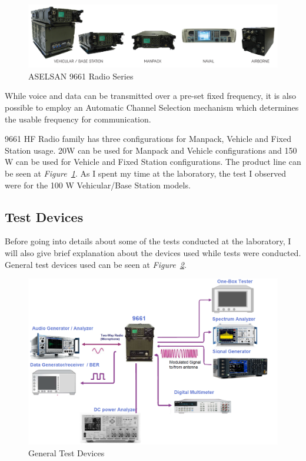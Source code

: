 \begin{figure}[H]
	\center
	\setlength{\unitlength}{\textwidth} 
	\includegraphics[width=0.95\unitlength]{radio_type}
	\caption{\label{fig:radtyp}ASELSAN 9661 Radio Series\cite{9661} }
\end{figure}

	 While voice and data can be transmitted over a pre-set fixed frequency, it is also possible to employ an Automatic Channel Selection mechanism which determines the usable frequency for communication.

	


	
	9661 HF Radio family has three configurations for Manpack, Vehicle and Fixed Station usage. 20W can be used for Manpack and Vehicle configurations and 150 W can be used for Vehicle and Fixed Station configurations. The product line can be seen at \textit{Figure~\ref{fig:radtyp}}. As I spent my time at the laboratory, the test I observed were for the 100 W Vehicular/Base Station models. 




\subsection{Test Devices}
\- \indent
	Before going into details about some of the tests conducted at the laboratory, I will also give brief explanation about the devices used while tests were conducted. General test devices used can be seen at \textit{Figure~\ref{fig:components}}.

\begin{figure}[H]
	\center
	\setlength{\unitlength}{\textwidth} 
	\includegraphics[width=0.73\unitlength]{components}
	\caption{\label{fig:components}General Test Devices \cite{9661,specan,keysight,mult}}
\end{figure}

